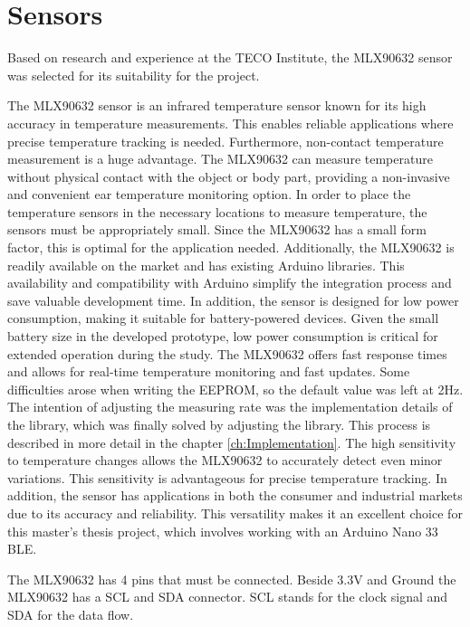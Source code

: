 
\section{Sensors}
\label{ch:Design:Prototype:Sensors}

Based on research and experience at the TECO Institute, the MLX90632 sensor was selected for its suitability for the project.

The MLX90632 sensor is an infrared temperature sensor known for its high accuracy in temperature measurements. This enables reliable applications where precise temperature tracking is needed.
Furthermore, non-contact temperature measurement is a huge advantage. 
The MLX90632 can measure temperature without physical contact with the object or body part, providing a non-invasive and convenient ear temperature monitoring option.
In order to place the temperature sensors in the necessary locations to measure temperature, the sensors must be appropriately small. 
Since the MLX90632 has a small form factor, this is optimal for the application needed.
Additionally, the MLX90632 is readily available on the market and has existing Arduino libraries. 
This availability and compatibility with Arduino simplify the integration process and save valuable development time.
In addition, the sensor is designed for low power consumption, making it suitable for battery-powered devices. 
Given the small battery size in the developed prototype, low power consumption is critical for extended operation during the study.
The MLX90632 offers fast response times and allows for real-time temperature monitoring and fast updates. 
Some difficulties arose when writing the EEPROM, so the default value was left at 2Hz.
The intention of adjusting the measuring rate was the implementation details of the library, which was finally solved by adjusting the library. 
This process is described in more detail in the chapter \ref{ch:Implementation}.
The high sensitivity to temperature changes allows the MLX90632 to accurately detect even minor variations. 
This sensitivity is advantageous for precise temperature tracking.
In addition, the sensor has applications in both the consumer and industrial markets due to its accuracy and reliability. 
This versatility makes it an excellent choice for this master's thesis project, which involves working with an Arduino Nano 33 BLE.

The MLX90632 has 4 pins that must be connected. 
Beside 3.3V and Ground the MLX90632 has a SCL and SDA connector. 
SCL stands for the clock signal and SDA for the data flow.

